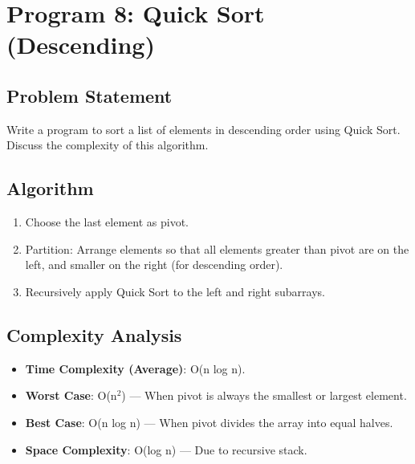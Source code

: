 \documentclass[a4paper,12pt]{article}
\begin{document}
\section*{Program 8: Quick Sort (Descending)}

\subsection*{Problem Statement}
Write a program to sort a list of elements in descending order using Quick Sort. Discuss the complexity of this algorithm.

\subsection*{Algorithm}
\begin{enumerate}
    \item Choose the last element as pivot.
    \item Partition: Arrange elements so that all elements greater than pivot are on the left, and smaller on the right (for descending order).
    \item Recursively apply Quick Sort to the left and right subarrays.
\end{enumerate}

\subsection*{Complexity Analysis}
\begin{itemize}
    \item \textbf{Time Complexity (Average)}: O(n log n).
    \item \textbf{Worst Case}: O(n$^2$) — When pivot is always the smallest or largest element.
    \item \textbf{Best Case}: O(n log n) — When pivot divides the array into equal halves.
    \item \textbf{Space Complexity}: O(log n) — Due to recursive stack.
\end{itemize}
\end{document}
